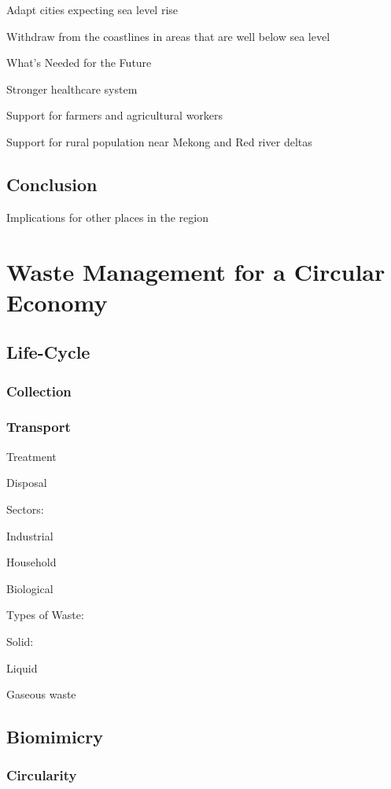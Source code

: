 \documentclass{book}\usepackage{knitr}
\begin{document}
Adapt cities expecting sea level rise

Withdraw from the coastlines in areas that are well below sea level

What's Needed for the Future

Stronger healthcare system

Support for farmers and agricultural workers

Support for rural population near Mekong and Red river deltas

\section{Conclusion}

Implications for other places in the region


\chapter{Waste Management for a Circular Economy}

\section{Life-Cycle}

\subsection{Collection}

\subsection{Transport}

Treatment

Disposal

Sectors:

Industrial

Household

Biological 

Types of Waste:

Solid:

Liquid

Gaseous waste

\section{Biomimicry}

\subsection{Circularity}
\end{document}
